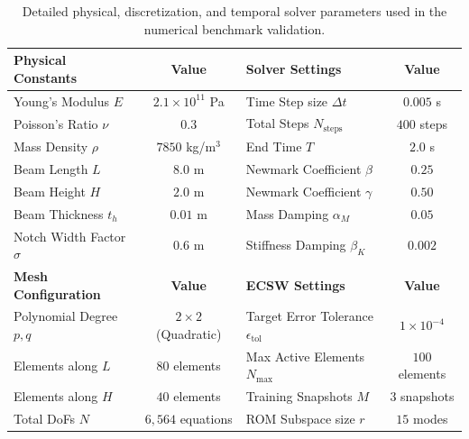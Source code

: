 \begin{table}[htbp]
    \centering
    \caption{Detailed physical, discretization, and temporal solver parameters used in the numerical benchmark validation.}
    \label{tab:sim_parameters}
    \begin{tabular}{lclc}
        \toprule
        \textbf{Physical Constants} & \textbf{Value} & \textbf{Solver Settings} & \textbf{Value} \\
        \midrule
        Young's Modulus $E$ & $2.1 \times 10^{11}$ Pa & Time Step size $\Delta t$ & $0.005$ s \\
        Poisson's Ratio $\nu$ & $0.3$ & Total Steps $N_{\text{steps}}$ & $400$ steps \\
        Mass Density $\rho$ & $7850$ kg/m$^3$ & End Time $T$ & $2.0$ s \\
        Beam Length $L$ & $8.0$ m & Newmark Coefficient $\beta$ & $0.25$ \\
        Beam Height $H$ & $2.0$ m & Newmark Coefficient $\gamma$ & $0.50$ \\
        Beam Thickness $t_h$ & $0.01$ m & Mass Damping $\alpha_M$ & $0.05$ \\
        Notch Width Factor $\sigma$ & $0.6$ m & Stiffness Damping $\beta_K$ & $0.002$ \\
        \midrule
        \textbf{Mesh Configuration} & \textbf{Value} & \textbf{ECSW Settings} & \textbf{Value} \\
        \midrule
        Polynomial Degree $p, q$ & $2 \times 2$ (Quadratic) & Target Error Tolerance $\epsilon_{\text{tol}}$ & $1 \times 10^{-4}$ \\
        Elements along $L$ & $80$ elements & Max Active Elements $N_{\text{max}}$ & $100$ elements \\
        Elements along $H$ & $40$ elements & Training Snapshots $M$ & $3$ snapshots \\
        Total DoFs $N$ & $6,564$ equations & ROM Subspace size $r$ & $15$ modes \\
        \bottomrule
    \end{tabular}
\end{table}
